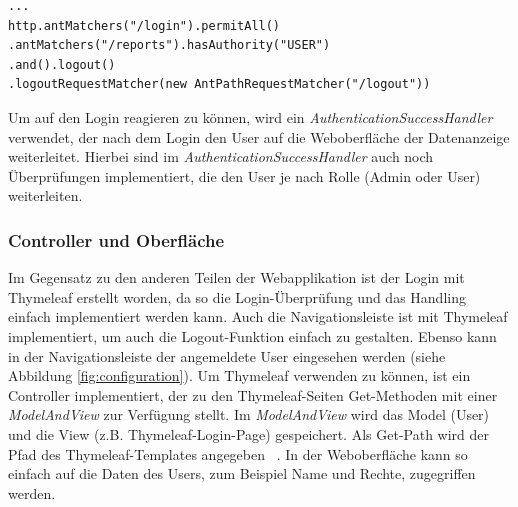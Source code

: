 \begin{samepage}%
	\begin{lstlisting}[float=tbhp]
...
http.antMatchers("/login").permitAll()
.antMatchers("/reports").hasAuthority("USER")
.and().logout()
.logoutRequestMatcher(new AntPathRequestMatcher("/logout"))
\end{lstlisting}
\end{samepage}
Um auf den Login reagieren zu können, wird ein \textit{AuthenticationSuccessHandler} verwendet, der nach dem Login den User auf die Weboberfläche der Datenanzeige weiterleitet. Hierbei sind im \textit{AuthenticationSuccessHandler} auch noch Überprüfungen implementiert, die den User je nach Rolle (Admin oder User) weiterleiten. 
\subsubsection{Controller und Oberfläche} 
Im Gegensatz zu den anderen Teilen der Webapplikation ist der Login mit Thymeleaf erstellt worden, da so die Login-Überprüfung und das Handling einfach implementiert werden kann. Auch die Navigationsleiste ist mit Thymeleaf implementiert, um auch die Logout-Funktion einfach zu gestalten. Ebenso kann in der Navigationsleiste der angemeldete User eingesehen werden (siehe Abbildung \ref{fig:configuration}). Um Thymeleaf verwenden zu können, ist ein Controller implementiert, der zu den Thymeleaf-Seiten Get-Methoden mit einer \textit{ModelAndView} zur Verfügung stellt. Im \textit{ModelAndView} wird das Model (User) und die View (z.B. Thymeleaf-Login-Page) gespeichert. Als Get-Path wird der Pfad des Thymeleaf-Templates angegeben ~\parencite[Seite 160]{springSecBook}. In der Weboberfläche kann so einfach auf die Daten des Users, zum Beispiel Name und Rechte, zugegriffen werden.
